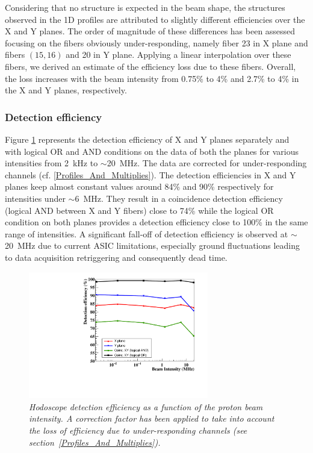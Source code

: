 \documentclass[a4paper,11pt]{article}
\begin{document}
Considering that no structure is expected in the beam shape, the structures observed in the 1D profiles are attributed to slightly different efficiencies over the X and Y planes. The order of magnitude of these differences has been assessed focusing on the fibers obviously under-responding, namely fiber 23 in X plane and fibers $(15,16)$ and 20 in Y plane. Applying a linear interpolation over these fibers, we derived an estimate of the efficiency loss due to these fibers. Overall, the loss increases with the beam intensity from 0.75\% to 4\% and 2.7\% to 4\% in the X and Y planes, respectively.  

\subsubsection{Detection efficiency}

Figure \ref{fig:DE} represents the detection efficiency of X and Y planes separately and with logical OR and AND conditions on the data of both the planes for various intensities from 2~kHz to $\sim$20~MHz. The data are corrected for under-responding channels (cf. \ref{Profiles_And_Multiplies}). The detection efficiencies in X and Y planes keep almost constant values around 84\% and 90\% respectively for intensities under $\sim$6~MHz. They result in a coincidence detection efficiency (logical AND between X and Y fibers) close to 74\% while the logical OR condition on both planes provides a detection efficiency close to 100\% in the same range of intensities. A significant fall-off of detection efficiency is observed at $\sim$20~MHz due to current ASIC limitations, especially ground fluctuations leading to data acquisition retriggering and consequently dead time.   

\begin{figure}[htb]
\centering
\includegraphics[width=0.7\textwidth]{figures/DE_March_2019_corr.pdf}
\caption{\small{\textit{Hodoscope  detection  efficiency  as  a  function  of the proton beam intensity. A correction factor has been applied to take into account the loss of efficiency due to under-responding channels (see section~\ref{Profiles_And_Multiplies}).}}}
\label{fig:DE}
\end{figure}
\end{document}
